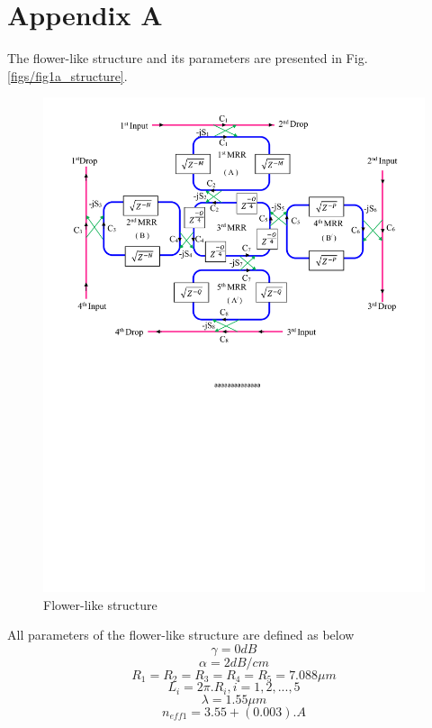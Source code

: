 \documentclass{osa-article}
\begin{document}
\section*{Appendix A}
\label{Appendix A}
The flower-like structure and its parameters are presented in Fig.\ref{figs/fig1a_structure}.
   \begin{figure}[tb]
\centering
\includegraphics[width=4 in]{figs/fig1a_structure.pdf}
	\caption{Flower-like structure}
	\label{fig1a_structure}
\end{figure}
All parameters of the flower-like structure are defined as below\\
 \begin{equation}
\gamma=0 dB
\label{eqa1}
\end{equation}
 \begin{equation}
\alpha=2 dB/cm
\label{eqa2}
\end{equation}
 \begin{equation}
R_1=R_2=R_3=R_4=R_5=7.088 {\mu}m
\label{eqa3}
\end{equation}
 \begin{equation}
L_i=2{\pi}.{R_i}, i=1, 2,..., 5
\label{eqa4}
\end{equation}
 \begin{equation}
\lambda=1.55{\mu}m
\label{eqa5}
\end{equation}
 \begin{equation}
n_{eff1}=3.55+(0.003).A
\label{eqa6}
\end{equation}
\end{document}
